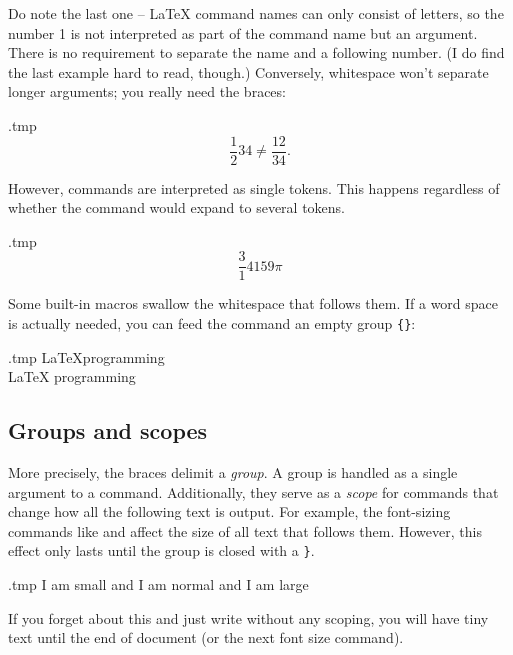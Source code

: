 Do note the last one -- \LaTeX{} command names can only consist of letters,
so the number 1 is not interpreted as part of the command name but an argument.
There is no requirement to separate the name and a following number.
(I do find the last example hard to read, though.)
Conversely, whitespace won't separate longer arguments; you really need the braces:

\begin{VerbatimOut}{\jobname.tmp}
\[
\frac 12 34
\neq \frac {12} {34}.
\]
\end{VerbatimOut}
\ShowExample

However, commands are interpreted as single tokens.
This happens regardless of whether the command would expand to several tokens.

\begin{VerbatimOut}{\jobname.tmp}
\newcommand{\magic}{314 159}
\[ \frac \magic \pi \]
\end{VerbatimOut}
\ShowExample

\begin{gotcha}
Some built-in macros swallow the whitespace that follows them.
If a word space is actually needed, you can feed the command an empty group \verb|{}|:
\begin{VerbatimOut}{\jobname.tmp}
\LaTeX programming\\
\LaTeX{} programming
\end{VerbatimOut}
\ShowExample
\end{gotcha}


%
\subsection{Groups and scopes}

\label{ex:font scope}
More precisely, the braces delimit a \emph{group}.
A group is handled as a single argument to a command.
Additionally, they serve as a \emph{scope} for commands that change
how all the following text is output.
For example, the font-sizing commands like  and 
affect the size of all text that follows them.
However, this effect only lasts until the group is closed with a \verb|}|.

\begin{VerbatimOut}{\jobname.tmp}
{\tiny I am small}
and I am normal
and {\Large I am large}
\end{VerbatimOut}
\ShowExample

If you forget about this and just write  without any scoping,
you will have tiny text until the end of document (or the next font size command).

